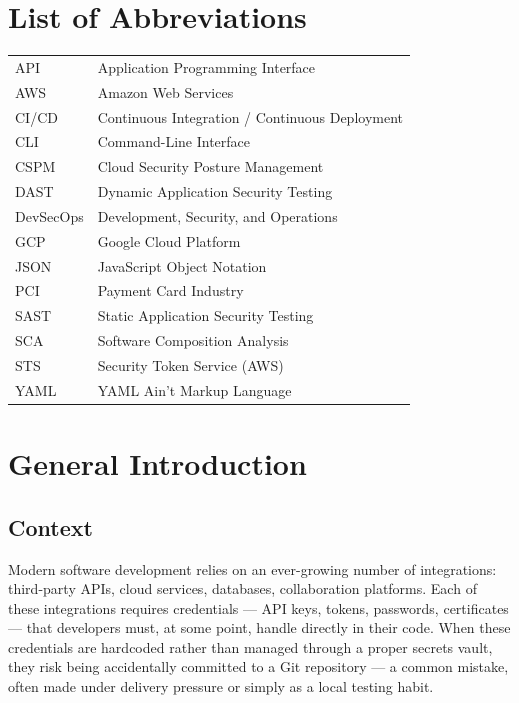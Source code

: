 \documentclass[12pt]{article}
\begin{document}
\section*{List of Abbreviations}

\begin{tabular}{@{}ll@{}}
API & Application Programming Interface \\
AWS & Amazon Web Services \\
CI/CD & Continuous Integration / Continuous Deployment \\
CLI & Command-Line Interface \\
CSPM & Cloud Security Posture Management \\
DAST & Dynamic Application Security Testing \\
DevSecOps & Development, Security, and Operations \\
GCP & Google Cloud Platform \\
JSON & JavaScript Object Notation \\
PCI & Payment Card Industry \\
SAST & Static Application Security Testing \\
SCA & Software Composition Analysis \\
STS & Security Token Service (AWS) \\
YAML & YAML Ain't Markup Language \\
\end{tabular}

\newpage

\section{General Introduction}

\subsection{Context}

Modern software development relies on an ever-growing number of integrations: third-party APIs, cloud services, databases, collaboration platforms. Each of these integrations requires credentials --- API keys, tokens, passwords, certificates --- that developers must, at some point, handle directly in their code. When these credentials are hardcoded rather than managed through a proper secrets vault, they risk being accidentally committed to a Git repository --- a common mistake, often made under delivery pressure or simply as a local testing habit.
\end{document}
